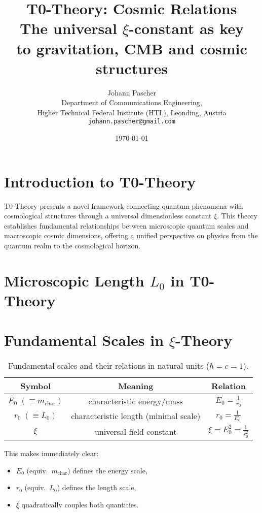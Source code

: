 \documentclass[12pt,a4paper]{article}
\title{\Huge\textbf{T0-Theory: Cosmic Relations}\\
	\Large The universal $\xi$-constant as key \\ to gravitation, CMB and cosmic structures}
\author{\Large Johann Pascher\\
	Department of Communications Engineering,\\
	Higher Technical Federal Institute (HTL), Leonding, Austria\\
	\texttt{johann.pascher@gmail.com}}
\date{\today}
\numberwithin{equation}{section}
\begin{document}
	
	\maketitle
	\thispagestyle{fancy}
	
	\tableofcontents
	
	\section{Introduction to T0-Theory}
	
	T0-Theory presents a novel framework connecting quantum phenomena with cosmological structures through a universal dimensionless constant $\xi$. This theory establishes fundamental relationships between microscopic quantum scales and macroscopic cosmic dimensions, offering a unified perspective on physics from the quantum realm to the cosmological horizon.
	
	\section{Microscopic Length $L_0$ in T0-Theory}
\section{Fundamental Scales in $\xi$-Theory}

\begin{table}[h!]
	\centering
	\renewcommand{\arraystretch}{1.5}
	\begin{tabular}{|c|c|c|}
		\hline
		\textbf{Symbol} & \textbf{Meaning} & \textbf{Relation} \\
		\hline
		$E_0 \;(\equiv m_{\mathrm{char}})$ & characteristic energy/mass & $E_0 = \tfrac{1}{r_0}$ \\
		\hline
		$r_0 \;(\equiv L_0)$ & characteristic length (minimal scale) & $r_0 = \tfrac{1}{E_0}$ \\
		\hline
		$\xi$ & universal field constant & $\xi = E_0^2 = \tfrac{1}{r_0^2}$ \\
		\hline
	\end{tabular}
	\caption{Fundamental scales and their relations in natural units ($\hbar = c = 1$).}
\end{table}

This makes immediately clear:
\begin{itemize}
	\item $E_0$ (equiv.\ $m_{\mathrm{char}}$) defines the energy scale,
	\item $r_0$ (equiv.\ $L_0$) defines the length scale,
	\item $\xi$ quadratically couples both quantities.
\end{itemize}	
\end{document}
